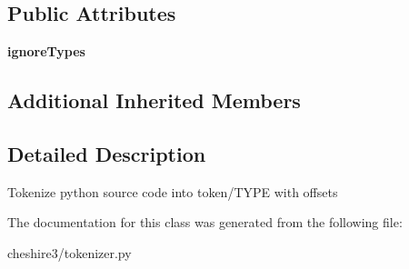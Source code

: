 \subsection*{Public Attributes}
\begin{DoxyCompactItemize}
\item 
\hypertarget{classcheshire3_1_1tokenizer_1_1_python_tokenizer_a0d64c66b3c5fbeb3728e31607e5f36f9}{{\bfseries ignore\-Types}}\label{classcheshire3_1_1tokenizer_1_1_python_tokenizer_a0d64c66b3c5fbeb3728e31607e5f36f9}

\end{DoxyCompactItemize}
\subsection*{Additional Inherited Members}


\subsection{Detailed Description}
\begin{DoxyVerb}Tokenize python source code into token/TYPE with offsets \end{DoxyVerb}
 

The documentation for this class was generated from the following file\-:\begin{DoxyCompactItemize}
\item 
cheshire3/tokenizer.\-py\end{DoxyCompactItemize}
